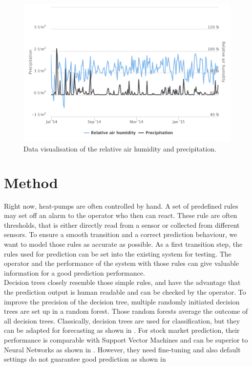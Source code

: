 \documentclass{scrartcl}
\begin{document}
\begin{figure}[H]
  \centering
  \includegraphics[width=0.8\linewidth]{img/humidity.png}
  \caption{Data visualisation of the relative air humidity and precipitation.}
  \label{fig:humidity}
\end{figure}


\section{Method}
Right now, heat-pumps are often controlled by hand. A set of predefined rules may set off an alarm to the operator who then can react. These rule are often thresholds, that is either directly read from a sensor or collected from different sensors. To ensure a smooth transition and a correct prediction behaviour, we want to model those rules as accurate as possible. As a first transition step, the rules used for prediction can be set into the existing system for testing. The operator and the performance of the system with those rules can give valuable information for a good prediction performance.\\
Decision trees closely resemble those simple rules, and have the advantage that the prediction output is human readable and can be checked by the operator. To improve the precision of the decision tree, multiple randomly initiated decision trees are set up in a random forest. Those random forests average the outcome of all decision trees. Classically, decision trees are used for classification, but they can be adapted for forecasting as shown in \cite{pant1990innocents}. For stock market prediction, their performance is comparable with Support Vector Machines and can be superior to Neural Networks as shown in \cite{kumar2006forecasting}. However, they need fine-tuning and also default settings do not guarantee good prediction as shown in \cite{segal2004machine}
\end{document}
